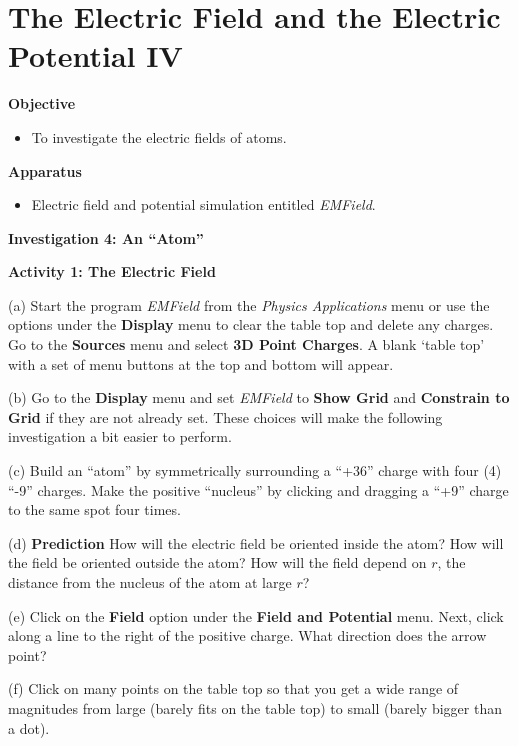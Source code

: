 
\section{The Electric Field and the Electric Potential IV}

\makelabheader %

\textbf{Objective}

\begin{itemize}
\item To investigate the electric fields of atoms.
\end{itemize}

\textbf{Apparatus}

\begin{itemize}
\item Electric field and potential simulation entitled {\it EMField}.
\end{itemize}

\textbf{Investigation 4: An {}``Atom''}

\textbf{Activity 1: The Electric Field}

(a) Start the program {\it EMField} from the {\it Physics Applications} menu or use the options under the 
\textbf{Display} menu to clear the table top and delete any charges.
Go to the \textbf{Sources} menu and select \textbf{3D Point Charges}.
A blank `table top' with a set of menu 
buttons at the top and bottom will appear.

(b) Go to the {\bf Display} menu and set {\it EMField} to
{\bf Show Grid} and {\bf Constrain to Grid} if they are not already set.
These choices will make the following investigation a bit easier to perform.

(c) Build an {}``atom'' by symmetrically surrounding
a {}``+36'' charge with four (4) {}``-9'' charges.
Make the positive ``nucleus'' by clicking and dragging a ``+9'' charge
to the same spot four times.


(d) {\bf Prediction} How will the electric field be oriented inside the atom?
How will the field be oriented outside the atom?
How will the field depend on $r$, the distance from the nucleus of the atom
at large $r$?
\answerspace{25mm}

(e) Click on the \textbf{Field} option under the \textbf{Field and Potential} menu.
Next, click along a line to the right of the positive charge.
What direction does the arrow point?
\answerspace{15mm}

(f) Click on many points on the table top so that you get a wide range of magnitudes from large
(barely fits on the table top) to small (barely bigger than a dot).

